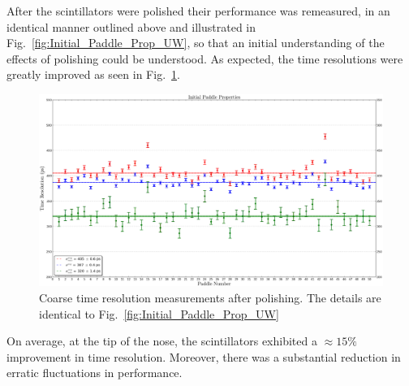 After the scintillators were polished their performance was remeasured, in an identical manner outlined above and illustrated in Fig.~\ref{fig:Initial_Paddle_Prop_UW}, so that an initial understanding of the effects of polishing could be understood.  As expected, the time resolutions were greatly improved as seen in Fig.~\ref{fig:Polished_Paddle_Prop_UW}.
\begin{figure}[!htb]
	\centering
	\includegraphics[width=1.0\columnwidth]{fabrication/figs/Polished_Paddle_Prop_UW}
	\caption[Coarse time resolution measurements after polishing]{Coarse time resolution measurements after polishing. The details are identical to Fig.~\ref{fig:Initial_Paddle_Prop_UW}}
	\label{fig:Polished_Paddle_Prop_UW}
\end{figure}
On average, at the tip of the nose, the scintillators exhibited a $\approx 15\%$ improvement in time resolution.  Moreover, there was a substantial reduction in erratic fluctuations in performance.